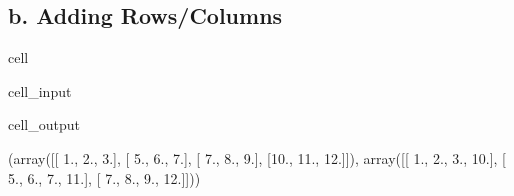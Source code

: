 \documentclass[letterpaper,10pt,english]{jupyterBook}
\begin{document}
\subsection{b. Adding Rows/Columns}
\label{\detokenize{lessons/Intro_to_Matrices_in_NumPy:b-adding-rows-columns}}
\begin{sphinxuseclass}{cell}\begin{sphinxVerbatimInput}

\begin{sphinxuseclass}{cell_input}
\begin{sphinxVerbatim}[commandchars=\\\{\}]
  \PYG{p}{[} \PYG{p}{[}  \PYG{p}{]}\PYG{p}{]}

  \PYG{p}{[} \PYG{p}{[}\PYG{p}{[}\PYG{p}{]} \PYG{p}{[}\PYG{p}{]} \PYG{p}{[}\PYG{p}{]}\PYG{p}{]}\PYG{p}{]}

 
\end{sphinxVerbatim}

\end{sphinxuseclass}\end{sphinxVerbatimInput}
\begin{sphinxVerbatimOutput}

\begin{sphinxuseclass}{cell_output}
\begin{sphinxVerbatim}[commandchars=\\\{\}]
(array([[ 1.,  2.,  3.],
        [ 5.,  6.,  7.],
        [ 7.,  8.,  9.],
        [10., 11., 12.]]),
 array([[ 1.,  2.,  3., 10.],
        [ 5.,  6.,  7., 11.],
        [ 7.,  8.,  9., 12.]]))
\end{sphinxVerbatim}

\end{sphinxuseclass}\end{sphinxVerbatimOutput}

\end{sphinxuseclass}
\end{document}
